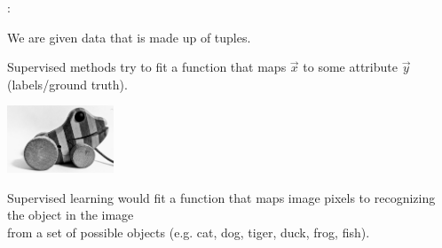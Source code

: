 
\begin{frame}{\secname:~\subsecname}

We are given data that is made up of tuples.

Supervised methods try to fit a function that maps $\vec x$ to some attribute $\vec y$ (labels/ground truth).

\begin{center}
	\includegraphics[height=2cm]{img/tigerente}
\end{center}

Supervised learning would fit a function that maps image pixels to recognizing the object in the image\\
from a set of possible objects (e.g. cat, dog, tiger, duck, frog, fish).
    
\end{frame}

